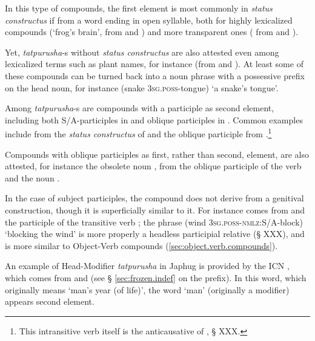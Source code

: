 In this type of compounds, the first element is most commonly in \textit{status constructus} if from a word ending in open syllable, both for highly lexicalized compounds  (`frog's brain', from  and ) and more transparent ones ( from   and ). 

Yet, \textit{tatpurusha}-s without \textit{status constructus} are also attested even among lexicalized terms such as plant names, for instance  (from  and ). At least some of these compounds can be turned back into a noun phrase with a possessive prefix on the head noun, for instance  (snake \textsc{3sg.poss}-tongue) `a snake's tongue'.

Among \textit{tatpurusha}-s are compounds with a participle as second element, including both S/A-participles in  and oblique participles in . Common examples include   from the \textit{status constructus} of  and the oblique participle  from .\footnote{This intransitive verb itself is the anticausative of , § XXX. }

Compounds with oblique participles as first, rather than second, element, are also attested, for instance the obsolete noun , from the oblique participle  of the verb  and the noun .

In the case of subject participles, the compound does not derive from a genitival construction, though it is superficially similar to it. For instance  comes from  and the participle  of the transitive verb ; the phrase  (wind \textsc{3sg.poss}-\textsc{nmlz}:S/A-block) `blocking the wind' is more properly a headless participial relative (§ XXX), and is more similar to Object-Verb compounds (\ref{sec:object.verb.compounds}).

An example of Head-Modifier \textit{tatpurusha} in Japhug is provided by the ICN , which comes from  and    (see § \ref{sec:frozen.indef} on the  prefix). In this word, which originally means `man's year (of life)', the word `man' (originally a modifier) appears second element.

